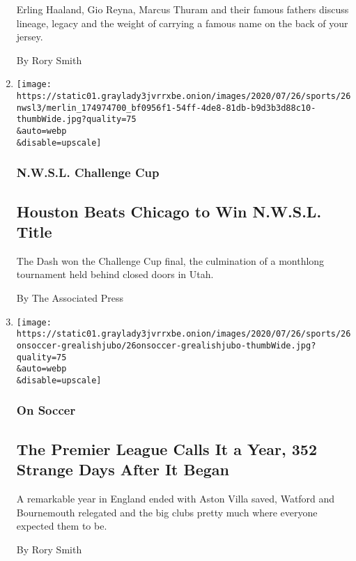 \begin{enumerate}
  Erling Haaland, Gio Reyna, Marcus Thuram and their famous fathers
  discuss lineage, legacy and the weight of carrying a famous name on
  the back of your jersey.

  By Rory Smith
\item
  \href{/2020/07/26/sports/soccer/houston-dash-nwsl.html}{}

  \texttt{[image: https://static01.graylady3jvrrxbe.onion/images/2020/07/26/sports/26nwsl3/merlin\_174974700\_bf0956f1-54ff-4de8-81db-b9d3b3d88c10-thumbWide.jpg?quality=75\\\&auto=webp\\\&disable=upscale]}

  \hypertarget{nwsl-challenge-cup}{%
  \subsubsection{N.W.S.L. Challenge Cup}\label{nwsl-challenge-cup}}

  \hypertarget{houston-beats-chicago-to-win-nwsl-title}{%
  \subsection{Houston Beats Chicago to Win N.W.S.L.
  Title}\label{houston-beats-chicago-to-win-nwsl-title}}

  The Dash won the Challenge Cup final, the culmination of a monthlong
  tournament held behind closed doors in Utah.

  By The Associated Press
\item
  \href{/2020/07/26/sports/soccer/premier-league-decision-day.html}{}

  \texttt{[image: https://static01.graylady3jvrrxbe.onion/images/2020/07/26/sports/26onsoccer-grealishjubo/26onsoccer-grealishjubo-thumbWide.jpg?quality=75\\\&auto=webp\\\&disable=upscale]}

  \hypertarget{on-soccer}{%
  \subsubsection{On Soccer}\label{on-soccer}}

  \hypertarget{the-premier-league-calls-it-a-year-352-strange-days-after-it-began}{%
  \subsection{The Premier League Calls It a Year, 352 Strange Days After
  It
  Began}\label{the-premier-league-calls-it-a-year-352-strange-days-after-it-began}}

  A remarkable year in England ended with Aston Villa saved, Watford and
  Bournemouth relegated and the big clubs pretty much where everyone
  expected them to be.

  By Rory Smith
\end{enumerate}

